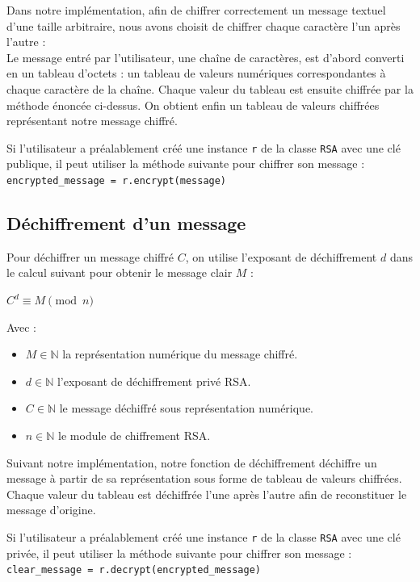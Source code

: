 \documentclass[a4paper, 12pt]{article}
\begin{document}
Dans notre implémentation, afin de chiffrer correctement un message textuel d'une taille arbitraire, nous avons choisit de chiffrer chaque caractère l'un après l'autre : \\
Le message entré par l'utilisateur, une chaîne de caractères, est d'abord converti en un tableau d'octets : un tableau de valeurs numériques correspondantes à chaque caractère de la chaîne. Chaque valeur du tableau est ensuite chiffrée par la méthode énoncée ci-dessus. On obtient enfin un tableau de valeurs chiffrées représentant notre message chiffré.

Si l'utilisateur a préalablement créé une instance \texttt{r} de la classe \texttt{RSA} avec une clé publique, il peut utiliser la méthode suivante pour chiffrer son message : \\
\texttt{encrypted\_message = r.encrypt(message)}

\newpage
\subsection{Déchiffrement d'un message}

Pour déchiffrer un message chiffré $C$, on utilise l'exposant de déchiffrement $d$ dans le calcul suivant pour obtenir le message clair $M$ :
\begin{center}
    \large $C^d \equiv M \pmod n$ 
\end{center}

Avec :
\begin{itemize}[label=\textbullet]
    \item { \large $M \in \mathbb{N}$ } la représentation numérique du message chiffré.
    \item { \large $d \in \mathbb{N}$ } l'exposant de déchiffrement privé RSA.
    \item { \large $C \in \mathbb{N}$ } le message déchiffré sous représentation numérique.
    \item { \large $n \in \mathbb{N}$ } le module de chiffrement RSA.
\end{itemize}
\bigskip

Suivant notre implémentation, notre fonction de déchiffrement déchiffre un message à partir de sa représentation sous forme de tableau de valeurs chiffrées. Chaque valeur du tableau est déchiffrée l'une après l'autre afin de reconstituer le message d'origine.

Si l'utilisateur a préalablement créé une instance \texttt{r} de la classe \texttt{RSA} avec une clé privée, il peut utiliser la méthode suivante pour chiffrer son message : \\
\texttt{clear\_message = r.decrypt(encrypted\_message)}
\end{document}
